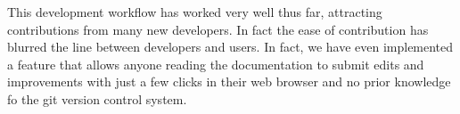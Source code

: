 \documentclass[11pt,twoside]{article}
\begin{document}
This development workflow has worked very well thus far, attracting
contributions from many new developers.  In fact the ease of contribution has
blurred the line between developers and users.  In fact, we have even
implemented a feature that allows anyone reading the documentation to submit
edits and improvements with just a few clicks in their web browser and no
prior knowledge fo the git version control system.


\end{document}
